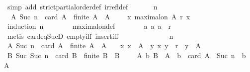\begin{isabellebody}
\ {\isacharparenleft}simp\ add{\isacharcolon}\ strict{\isacharunderscore}partial{\isacharunderscore}order{\isacharunderscore}def\ irrefl{\isacharunderscore}def{\isacharparenright}\ \isanewline
\ \ \ \ \isamarkupfalse%
\ n\isanewline
\ \ \ \ \isamarkupfalse%
\ {\isachardoublequoteopen}{\isasymforall}\ A{\isachardot}\ Suc\ n\ {\isacharequal}\ card\ A\ {\isasymlongrightarrow}\ finite\ A\ {\isasymlongrightarrow}\ A\ {\isasymnoteq}\ {\isasymemptyset}\ {\isasymlongrightarrow}\ {\isacharparenleft}{\isasymexists}\ x{\isachardot}\ maximal{\isacharunderscore}on\ A\ r\ x{\isacharparenright}{\isachardoublequoteclose}\isanewline
\ \ \ \ \ \ \isamarkupfalse%
\ {\isacharparenleft}induction\ n{\isacharparenright}\isanewline
\ \ \ \ \ \ \isamarkupfalse%
\ maximal{\isacharunderscore}on{\isacharunderscore}def\isanewline
\ \ \ \ \ \ \isamarkupfalse%
\ {\isacartoucheopen}{\isacharparenleft}{\isasymforall}a{\isachardot}\ {\isacharparenleft}a{\isacharcomma}\ a{\isacharparenright}\ {\isasymnotin}\ r{\isacharparenright}{\isacartoucheclose}\isanewline
\ \ \ \ \ \ \isamarkupfalse%
\ {\isacharparenleft}metis\ card{\isacharunderscore}eq{\isacharunderscore}SucD\ empty{\isacharunderscore}iff\ insert{\isacharunderscore}iff{\isacharparenright}\isanewline
\ \ \ \ \isamarkupfalse%
\ {\isacharminus}\isanewline
\ \ \ \ \ \ \isamarkupfalse%
\ n\isanewline
\ \ \ \ \ \ \isamarkupfalse%
\ {\isachardoublequoteopen}{\isasymforall}A{\isachardot}\ Suc\ n\ {\isacharequal}\ card\ A\ {\isasymlongrightarrow}\ finite\ A\ {\isasymlongrightarrow}\ A\ {\isasymnoteq}\ {\isasymemptyset}\ {\isasymlongrightarrow}\ {\isacharparenleft}{\isasymexists}x{\isachardot}\ x\ {\isasymin}\ A\ {\isasymand}\ {\isacharparenleft}{\isasymforall}y{\isachardot}\ {\isacharparenleft}x{\isacharcomma}\ y{\isacharparenright}\ {\isasymin}\ r\ {\isasymlongrightarrow}\ y\ {\isasymnotin}\ A{\isacharparenright}{\isacharparenright}{\isachardoublequoteclose}\isanewline
\ \ \ \ \ \ \isamarkupfalse%
\ {\isachardoublequoteopen}{\isasymforall}B{\isachardot}\ Suc\ {\isacharparenleft}Suc\ n{\isacharparenright}\ {\isacharequal}\ card\ B\ {\isasymlongrightarrow}\ finite\ B\ {\isasymlongrightarrow}\ B\ {\isasymnoteq}\ {\isasymemptyset}\ {\isasymlongrightarrow}\ {\isacharparenleft}{\isasymexists}\ A{\isacharprime}\ b{\isachardot}\ B\ {\isacharequal}\ A{\isacharprime}\ {\isasymunion}\ {\isacharbraceleft}b{\isacharbraceright}\ {\isasymand}\ card\ A{\isacharprime}\ {\isacharequal}\ Suc\ n\ {\isasymand}\ b\ {\isasymnotin}\ A{\isacharprime}{\isacharparenright}{\isachardoublequoteclose}\isanewline

\end{isabellebody}
